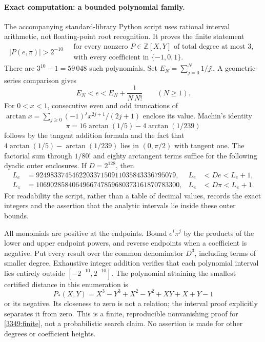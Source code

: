 \documentclass[11pt,a4paper]{article}
\newcommand{\Z}{\mathbb{Z}}
\numberwithin{equation}{section}
\begin{document}
\paragraph{Exact computation: a bounded polynomial family.}
The accompanying standard-library Python script uses rational interval
arithmetic, not floating-point root recognition. It proves the finite
statement
\begin{equation}\label{3349:finite}
 \left|P(e,\pi)\right|>2^{-10}
 \quad\begin{gathered}
  \text{for every nonzero }P\in\Z[X,Y]\text{ of total degree at most }3,\\
  \text{with every coefficient in }\{-1,0,1\}.
 \end{gathered}
\end{equation}
There are $3^{10}-1=59\,048$ such polynomials. Set
$E_N=\sum_{j=0}^N1/j!$. A geometric-series comparison gives
\begin{equation}
 E_N<e<E_N+\frac1{N\,N!}\qquad(N\geq1).
\end{equation}
For $0<x<1$, consecutive even and odd truncations of
$\arctan x=\sum_{j\geq0}(-1)^j x^{2j+1}/(2j+1)$ enclose its value.
Machin's identity
\begin{equation}
 \pi=16\arctan(1/5)-4\arctan(1/239)
\end{equation}
follows by the tangent addition formula and the fact that
$4\arctan(1/5)-\arctan(1/239)$ lies in $(0,\pi/2)$ with tangent one.
The factorial sum through $1/80!$ and eighty arctangent terms suffice for the
following dyadic outer enclosures. If $D=2^{128}$, then
\begin{align*}
 L_e&=924983374546220337150911035843336795079,
 & L_e&<De<L_e+1,\\
 L_\pi&=1069028584064966747859680373161870783300,
 & L_\pi&<D\pi<L_\pi+1.
\end{align*}
For readability the script, rather than a table of decimal values,
records the exact integers and the assertion that the analytic
intervals lie inside these outer bounds.

All monomials are positive at the endpoints. Bound $e^i\pi^j$ by the
products of the lower and upper endpoint powers, and reverse endpoints
when a coefficient is negative. Put every result over the common
denominator $D^3$, including terms of smaller degree. Exhaustive
integer addition verifies that each polynomial interval lies entirely
outside $[-2^{-10},2^{-10}]$. The polynomial attaining the smallest
certified distance in this enumeration is
\begin{equation}
 P_*(X,Y)=X^3-Y^3+X^2-Y^2+XY+X+Y-1
\end{equation}
or its negative. Its closeness to zero is not a relation; the interval
proof explicitly separates it from zero. This is a finite, reproducible
nonvanishing proof for \eqref{3349:finite}, not a probabilistic search
claim. No assertion is made for other degrees or coefficient heights.
\end{document}
